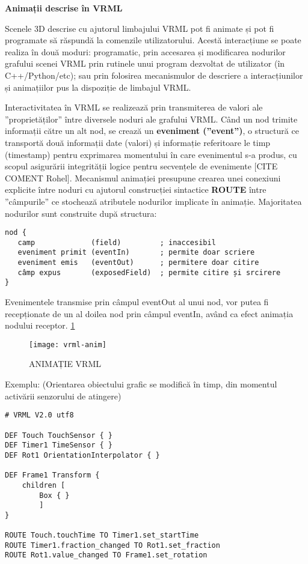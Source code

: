 \par \textbf{Animații descrise în VRML}
\par Scenele 3D descrise cu ajutorul limbajului VRML pot fi animate și pot fi programate să răspundă la comenzile utilizatorului. Acestă interacțiune se poate realiza în două moduri: programatic, prin accesarea și modificarea nodurilor grafului scenei VRML prin rutinele unui program dezvoltat de utilizator (în C++/Python/etc); sau prin folosirea mecanismulor de descriere a interacțiunilor și animațiilor pus la dispoziție de limbajul VRML.
\par Interactivitatea în VRML se realizează prin transmiterea de valori ale ”proprietăților” între diversele noduri ale grafului VRML. Când un nod trimite informații către un alt nod, se crează un \textbf{eveniment (”event”)}, o structură ce transportă două informații date (valori) și informație referitoare le timp (timestamp) pentru exprimarea momentului în care evenimentul s-a produs, cu scopul asigurării integrității logice pentru secvențele de evenimente [CITE COMENT Rohel]. Mecanismul animației presupune crearea unei conexiuni explicite între noduri cu ajutorul construcției sintactice \textbf{ROUTE} între ”câmpurile” ce stochează atributele nodurilor implicate în animație. Majoritatea nodurilor sunt construite după structura:
\begin{verbatim}
nod { 
   camp             (field)         ; inaccesibil
   eveniment primit (eventIn)       ; permite doar scriere
   eveniment emis   (eventOut)      ; permitere doar citire
   câmp expus       (exposedField)  ; permite citire și srcirere
}
\end{verbatim} 
Evenimentele transmise prin câmpul eventOut al unui nod, vor putea fi recepționate de un al doilea nod prin câmpul eventIn, având ca efect animația nodului receptor.	\ref{fig:vrmlanim}	

\begin{figure}[h]
    \centering
    \texttt{[image: vrml-anim]}
    \caption{ANIMAȚIE VRML}
    \label{fig:vrmlanim}
\end{figure}
\newpage
\par Exemplu: (Orientarea obiectului grafic se modifică în timp, din momentul activării senzorului de atingere)
\begin{verbatim}
# VRML V2.0 utf8 

DEF Touch TouchSensor { } 
DEF Timer1 TimeSensor { } 
DEF Rot1 OrientationInterpolator { } 

DEF Frame1 Transform { 
	children [ 
		Box { }   
		] 
} 

ROUTE Touch.touchTime TO Timer1.set_startTime 
ROUTE Timer1.fraction_changed TO Rot1.set_fraction 
ROUTE Rot1.value_changed TO Frame1.set_rotation

\end{verbatim}

